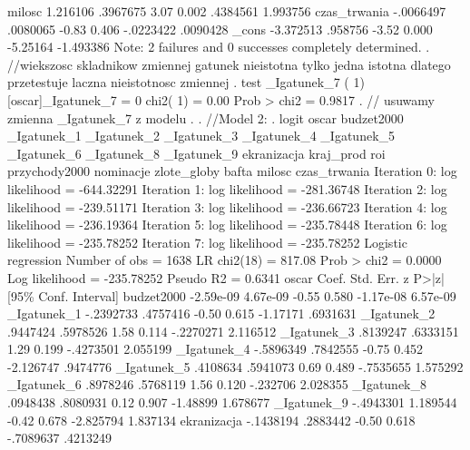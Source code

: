 \begin{stlog}
        milosc {\VBAR}   1.216106   .3967675     3.07   0.002     .4384561    1.993756
  czas_trwania {\VBAR}  -.0066497   .0080065    -0.83   0.406    -.0223422    .0090428
         _cons {\VBAR}  -3.372513    .958756    -3.52   0.000     -5.25164   -1.493386
Note: 2 failures and 0 successes completely determined.
{\smallskip}
. //wiekszosc skladnikow zmiennej gatunek nieistotna tylko jedna istotna dlatego przetestuje laczna 
nieistotnosc zmiennej
. test _Igatunek_7
{\smallskip}
 ( 1)  [oscar]_Igatunek_7 = 0
{\smallskip}
           chi2(  1) =    0.00
         Prob > chi2 =    0.9817
{\smallskip}
. //  usuwamy zmienna _Igatunek_7 z modelu
. 
. //Model 2:
. logit oscar  budzet2000 _Igatunek_1 _Igatunek_2 _Igatunek_3 _Igatunek_4 _Igatunek_5 _Igatunek_6 _Igatunek_8
 _Igatunek_9 ekranizacja kraj_prod roi przychody2000 nominacje zlote_globy bafta milosc czas_trwania
{\smallskip}
Iteration 0:   log likelihood = -644.32291  
Iteration 1:   log likelihood = -281.36748  
Iteration 2:   log likelihood = -239.51171  
Iteration 3:   log likelihood = -236.66723  
Iteration 4:   log likelihood = -236.19364  
Iteration 5:   log likelihood = -235.78448  
Iteration 6:   log likelihood = -235.78252  
Iteration 7:   log likelihood = -235.78252  
{\smallskip}
Logistic regression                               Number of obs   =       1638
                                                  LR chi2(18)     =     817.08
                                                  Prob > chi2     =     0.0000
Log likelihood = -235.78252                       Pseudo R2       =     0.6341
{\smallskip}
         oscar {\VBAR}      Coef.   Std. Err.      z    P>|z|     [95\% Conf. Interval]
    budzet2000 {\VBAR}  -2.59e-09   4.67e-09    -0.55   0.580    -1.17e-08    6.57e-09
   _Igatunek_1 {\VBAR}  -.2392733   .4757416    -0.50   0.615     -1.17171    .6931631
   _Igatunek_2 {\VBAR}   .9447424   .5978526     1.58   0.114    -.2270271    2.116512
   _Igatunek_3 {\VBAR}   .8139247   .6333151     1.29   0.199    -.4273501    2.055199
   _Igatunek_4 {\VBAR}  -.5896349   .7842555    -0.75   0.452    -2.126747    .9474776
   _Igatunek_5 {\VBAR}   .4108634   .5941073     0.69   0.489    -.7535655    1.575292
   _Igatunek_6 {\VBAR}   .8978246   .5768119     1.56   0.120     -.232706    2.028355
   _Igatunek_8 {\VBAR}   .0948438   .8080931     0.12   0.907     -1.48899    1.678677
   _Igatunek_9 {\VBAR}  -.4943301   1.189544    -0.42   0.678    -2.825794    1.837134
   ekranizacja {\VBAR}  -.1438194   .2883442    -0.50   0.618    -.7089637    .4213249

\end{stlog}
